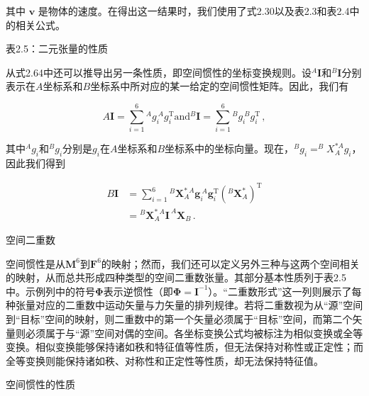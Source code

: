 \documentclass[10pt,a4paper]{book}
\theoremstyle{thmstyle} %
\theoremstyle{defstyle} %
\theoremstyle{prostyle} %
\begin{document}
其中 $\boldsymbol{v}$ 是物体的速度。在得出这一结果时，我们使用了式2.30以及表2.3和表2.4中的相关公式。



表2.5：二元张量的性质





从式2.64中还可以推导出另一条性质，即空间惯性的坐标变换规则。设$^{A}\boldsymbol{I}$和$^{B}\boldsymbol{I}$分别表示在$A$坐标系和$B$坐标系中所对应的某一给定的空间惯性矩阵。因此，我们有



$$
A \boldsymbol{ I } = \sum _ { i = 1 } ^{6} { ^ A g _ { i } ^{~ A} g _ { i } ^{\mathrm { T} } }  \mathrm { a n d }  { ^ B \boldsymbol{ I } } = \sum _ { i = 1 } ^{6} { ^ B g _ { i } ^{~ B} g _ { i } ^{\mathrm { T} } } \, ,
$$



其中$^{A}g_{i}$和$^{B}g_{i}$分别是$g_{i}$在$A$坐标系和$B$坐标系中的坐标向量。现在，$^{B}g_{i}=^{B}X_{A}^{*A}g_{i}$，因此我们得到



$$
\begin{array}{rl} { B { \boldsymbol{ I } } } & { = \sum _ { i = 1 } ^{6} { } ^{B} { \boldsymbol{ X } } _ { A } ^{* \ A} { \boldsymbol{ g } } _ { i } ^{\ A} { \boldsymbol{ g } } _ { i } ^{\mathrm { T} } \left( { } ^{B} { \boldsymbol{ X } } _ { A } ^{*} \right) ^{\mathrm { T} } } \\& { = { } ^{B} { \boldsymbol{ X } } _ { A } ^{* \ A} { \boldsymbol{ I } } ^{\ A} { \boldsymbol{ X } } _ { B } \, . } \end{array}
$$



空间二重数



空间惯性是从$\mathbf{M}^{6}$到$\mathbf{F}^{6}$的映射；然而，我们还可以定义另外三种与这两个空间相关的映射，从而总共形成四种类型的空间二重数张量。其部分基本性质列于表2.5中。示例列中的符号$\boldsymbol{\Phi}$表示逆惯性（即$\boldsymbol{\Phi}=\mathbf{I}^{-1}$）。“二重数形式”这一列则展示了每种张量对应的二重数中运动矢量与力矢量的排列规律。若将二重数视为从“源”空间到“目标”空间的映射，则二重数中的第一个矢量必须属于“目标”空间，而第二个矢量则必须属于与“源”空间对偶的空间。各坐标变换公式均被标注为相似变换或全等变换。相似变换能够保持诸如秩和特征值等性质，但无法保持对称性或正定性；而全等变换则能保持诸如秩、对称性和正定性等性质，却无法保持特征值。



空间惯性的性质
\end{document}
